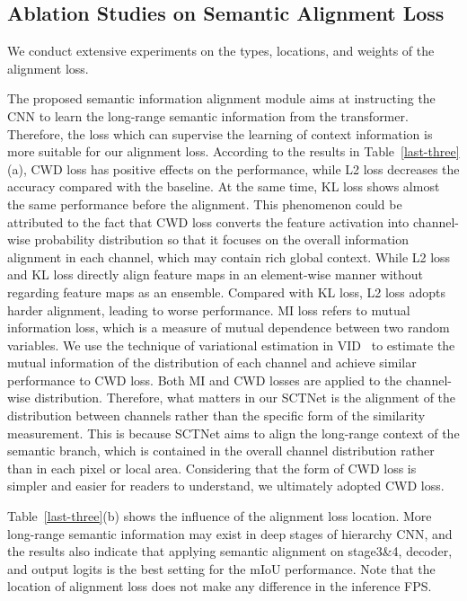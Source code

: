 \documentclass[letterpaper]{article} %
\begin{document}
\subsection{Ablation Studies on Semantic Alignment Loss}
We conduct extensive experiments on the types, locations, and weights of the alignment loss.

The proposed semantic information alignment module aims at instructing the CNN to learn the long-range semantic information from the transformer. Therefore, the loss which can supervise the learning of context information is more suitable for our alignment loss. According to the results in Table~\ref{last-three}(a), CWD loss has positive effects on the performance, while L2 loss decreases the accuracy compared with the baseline. At the same time, KL loss shows almost the same performance before the alignment. This phenomenon could be attributed to the fact that CWD loss converts the feature activation into channel-wise probability distribution so that it focuses on the overall information alignment in each channel, which may contain rich global context. While L2 loss and KL loss directly align feature maps in an element-wise manner without regarding feature maps as an ensemble. Compared with KL loss, L2 loss adopts harder alignment, leading to worse performance. MI loss refers to mutual information loss, which is a measure of mutual dependence between two random variables. We use the technique of variational estimation in VID~\cite{ahn2019variational} to estimate the mutual information of the distribution of each channel and achieve similar performance to CWD loss. Both MI and CWD losses are applied to the channel-wise distribution. Therefore, what matters in our SCTNet is the alignment of the distribution between channels rather than the specific form of the similarity measurement. This is because SCTNet aims to align the long-range context of the semantic branch, which is contained in the overall channel distribution rather than in each pixel or local area. Considering that the form of CWD loss is simpler and easier for readers to understand, we ultimately adopted CWD loss.

Table~\ref{last-three}(b) shows the influence of the alignment loss location. More long-range semantic information may exist in deep stages of hierarchy CNN, and the results also indicate that applying semantic alignment on stage3\&4, decoder, and output logits is the best setting for the mIoU performance. Note that the location of alignment loss does not make any difference in the inference FPS.
\end{document}
